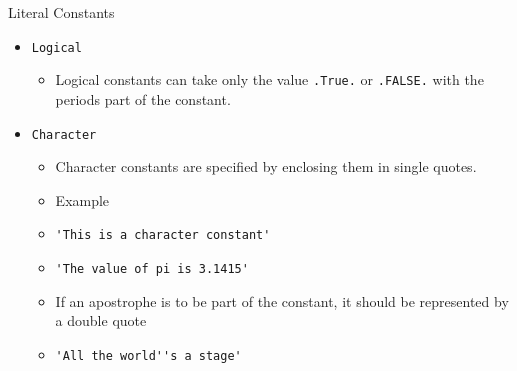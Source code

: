 \documentclass[c,mathserif,compress,xcolor=svgnames]{beamer}
\newcommand{\lstfortran}[1]{\lstinline[language={[90]Fortran},basicstyle=\footnotesize\ttfamily]|#1|}
\begin{document}
\begin{frame}[allowframebreaks]{Literal Constants}
\begin{itemize}
\begin{itemize}
      \item Example
      \item[] \lstfortran{(1.0,0.0)}
      \item[] \lstfortran{(-2.7e4,5.0)}
      \item For systems that support double precision complex, the floating point constants must use the {\em d} notation.
      \item[] \lstfortran{(-2.7d-4,5.d0)}
    \end{itemize}
    \item[] \lstfortran{Logical}
    \begin{itemize}
      \item Logical constants can take only the value \lstfortran{.True.} or \lstfortran{.FALSE.} with the periods part of the constant.
    \end{itemize}
    \framebreak
    \item[] \lstfortran{Character}
    \begin{itemize}
      \footnotesize
      \item Character constants are specified by enclosing them in single quotes.
      \item Example
      \item[] \lstfortran{'This is a character constant'}
      \item[] \lstfortran{'The value of pi is 3.1415'}
      \item If an apostrophe is to be part of the constant, it should be represented by a double quote
      \item[] \lstfortran{'All the world''s a stage'}
    \end{itemize}
  \end{itemize}
\end{frame}
\end{document}
